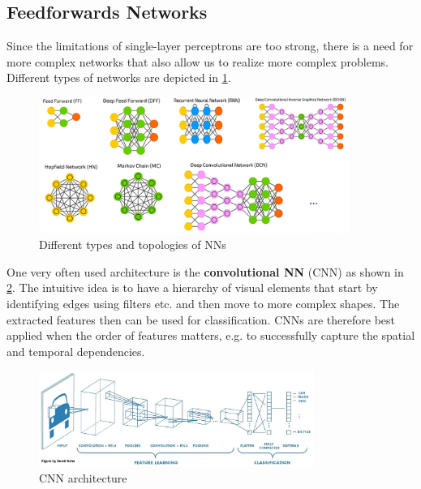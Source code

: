 \subsection{Feedforwards Networks}

Since the limitations of single-layer perceptrons are too strong, there is a need for more complex networks that also allow us to realize more complex problems. Different types of networks are depicted in \ref{fig:6_fnn_types}. 

\begin{figure}[H]
  \centering
  \includegraphics[width=0.9\textwidth]{assets/nn/fnn__types_topologies.png}
  \caption{Different types and topologies of NNs}
  \label{fig:6_fnn_types}
\end{figure}

One very often used architecture is the \textbf{convolutional NN} (CNN) as shown in \ref{fig:6_fnn_cnn}. The intuitive idea is to have a hierarchy of visual elements that start by identifying edges using filters etc. and then move to more complex shapes. The extracted features then can be used for classification. CNNs are therefore best applied when the order of features matters, e.g. to successfully capture the spatial and temporal dependencies.

\begin{figure}[H]
  \centering
  \includegraphics[width=0.8\textwidth]{assets/nn/fnn__cnn.png}
  \caption{CNN architecture}
  \label{fig:6_fnn_cnn}
\end{figure}

